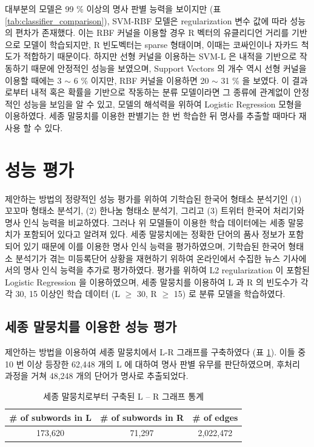 \documentclass[oneside, ko,phd]{snuthesis_utf8_kor}
\begin{document}
대부분의 모델은 99 \% 이상의 명사 판별 능력을 보이지만 (표 \ref{tab:classifier_comparison}), SVM-RBF 모델은 regularization 변수 값에 따라 성능의 편차가 존재했다.
이는 RBF 커널을 이용할 경우 R 벡터의 유클리디언 거리를 기반으로 모델이 학습되지만, R 빈도벡터는 sparse 형태이며, 이때는 코싸인이나 자카드 척도가 적합하기 때문이다.
하지만 선형 커널을 이용하는 SVM-L 은 내적을 기반으로 작동하기 때문에 안정적인 성능을 보였으며, Support Vectors 의 개수 역시 선형 커널을 이용할 때에는 3 $\sim$ 6 \% 이지만, RBF 커널을 이용하면 20 $\sim$ 31 \%  을 보였다.
이 결과로부터 내적 혹은 확률을 기반으로 작동하는 분류 모델이라면 그 종류에 관계없이 안정적인 성능을 보임을 알 수 있고, 모델의 해석력을 위하여 Logistic Regression 모형을 이용하였다.
세종 말뭉치를 이용한 판별기는 한 번 학습한 뒤 명사를 추출할 때마다 재사용 할 수 있다.

\section{성능 평가}

제안하는 방법의 정량적인 성능 평가를 위하여 기학습된 한국어 형태소 분석기인 (1) 꼬꼬마 형태소 분석기, (2) 한나눔 형태소 분석기, 그리고 (3) 트위터 한국어 처리기와 명사 인식 능력을 비교하였다.
그러나 위 모델들이 이용한 학습 데이터에는 세종 말뭉치가 포함되어 있다고 알려져 있다.
세종 말뭉치에는 정확한 단어의 품사 정보가 포함되어 있기 때문에 이를 이용한 명사 인식 능력을 평가하였으며, 기학습된 한국어 형태소 분석기가 겪는 미등록단어 상황을 재현하기 위하여 온라인에서 수집한 뉴스 기사에서의 명사 인식 능력을 추가로 평가하였다.
평가를 위하여 L2 regularization 이 포함된 Logistic Regression 을 이용하였으며, 세종 말뭉치를 이용하여 L 과 R 의 빈도수가 각각 30, 15 이상인 학습 데이터 (L $\geq$ 30, R $\geq$ 15) 로 분류 모델을 학습하였다.

\subsection{세종 말뭉치를 이용한 성능 평가}

제안하는 방법을 이용하여 세종 말뭉치에서 L-R 그래프를 구축하였다 (표 \ref{tab:sejong_statistics}).
이들 중 10 번 이상 등장한 62,448 개의 L 에 대하여 명사 판별 유무를 판단하였으며, 후처리 과정을 거쳐 48,248 개의 단어가 명사로 추출되었다.

\begin{table}[ht]
\centering
\caption{세종 말뭉치로부터 구축된 L – R 그래프 통계}
\label{tab:sejong_statistics}
\begin{tabular}{|c|c|c|}
\hline
\# of subwords in L & \# of subwords in R & \# of edges \\ \hline
173,620 & 71,297 & 2,022,472   \\ \hline
\end{tabular}%
\end{table}
\end{document}
